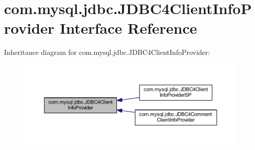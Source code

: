 \hypertarget{interfacecom_1_1mysql_1_1jdbc_1_1_j_d_b_c4_client_info_provider}{}\section{com.\+mysql.\+jdbc.\+J\+D\+B\+C4\+Client\+Info\+Provider Interface Reference}
\label{interfacecom_1_1mysql_1_1jdbc_1_1_j_d_b_c4_client_info_provider}


Inheritance diagram for com.\+mysql.\+jdbc.\+J\+D\+B\+C4\+Client\+Info\+Provider\+:
\nopagebreak
\begin{figure}[H]
\begin{center}
\leavevmode
\includegraphics[width=350pt]{interfacecom_1_1mysql_1_1jdbc_1_1_j_d_b_c4_client_info_provider__inherit__graph}
\end{center}
\end{figure}
